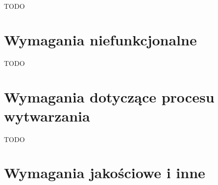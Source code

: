 TODO

\section{Wymagania niefunkcjonalne}
\label{sec:wymagania-niefunkcjonalne}

TODO

\section{Wymagania dotyczące procesu wytwarzania}
\label{sec:wymagania-dotyczace-procesu-wytwarzania}

TODO

\section{Wymagania jakościowe i inne}
\label{sec:wymagania-jakosciowe-i-inne}
